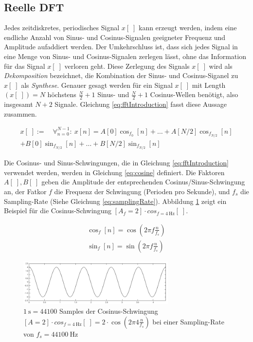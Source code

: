 \subsection{Reelle DFT}
\label{sec:realDFT}

Jedes zeitdiskretes, periodisches Signal $x[\;]$ kann erzeugt werden, indem eine endliche Anzahl von Sinus- und Cosinus-Signalen geeigneter Frequenz und Amplitude aufaddiert werden. Der Umkehrschluss ist, dass sich jedes Signal in eine Menge von Sinus- und Cosinus-Signalen zerlegen lässt, ohne das Information für das Signal $x[\;]$ verloren geht. Diese Zerlegung des Signals $x[\;]$ wird als \emph{Dekomposition} bezeichnet, die Kombination der Sinus- und Cosinus-Siganel zu $x[\;]$ als \emph{Synthese}. Genauer gesagt werden für ein Signal $x[\;]$ mit Length$(x[\;]) = N$ höchstens $\frac{N}{2}+1$ Sinus- und $\frac{N}{2}+1$ Cosinus-Wellen benötigt, also insgesamt $N+2$ Signale. Gleichung \ref{eq:fftIntroduction} fasst diese Aussage zusammen. \cite[S. 144 - 147 ]{dspGuide}

\begin{equation}
\label{eq:fftIntroduction}
\begin{split}
x[\;] := \quad \mathop{\forall}_{n = 0}^{N-1} :\ x[n] =  A[0]\cos_{f_0}[n] + \ldots + A[N/2]\cos_{f_{N/2}}[n]  \\ + B[0]\sin_{f_{N/2}}[n] + \ldots + B[N/2] \sin_{f_{N/2}}[n]
\end{split}
\end{equation}


Die Cosinus- und Sinus-Schwingungen, die in Gleichung \ref{eq:fftIntroduction} verwendet werden, werden in Gleichung \ref{eq:cosine} definiert. Die Faktoren $A[\;],B[\;]$ geben die Amplitude der entsprechenden Cosinus/Sinus-Schwingung an, der Fatkor $f$ die Frequenz der Schwingung (Perioden pro Sekunde), und $f_s$ die Sampling-Rate (Siehe Gleichung \ref{eq:samplingRate}). \cite[S. 62]{dspMichigan} \cite[S. 150]{dspGuide} Abbildung \ref{img:aSimpleCosine} zeigt ein Beispiel für die Cosinus-Schwingung $[A_f=2] \cdot cos_{f=\SI{4}{\hertz}}[\;]$.

\begin{equation}
\label{eq:cosine}
\begin{gathered}
\cos_{f}[n]  = \cos(2\pi f \frac{n}{f_s}) \\
\sin_{f}[n]  = \sin(2\pi f \frac{n}{f_s})
\end{gathered}
\end{equation}

\begin{figure}[h]
	\centering
	\includegraphics[width=0.7\textwidth]{bilder/aSimpleCosine.png}
	\caption{$\SI{1}{\second} = 44100 $ Samples der Cosinus-Schwingung $[A = 2] \cdot cos_{f=\SI{4}{\hertz}}[\;] =  2 \cdot \cos(2\pi 4 \frac{n}{f_s})$ bei einer Sampling-Rate von $f_s = \SI{44100}{\hertz} $}
	\label{img:aSimpleCosine}
\end{figure}

